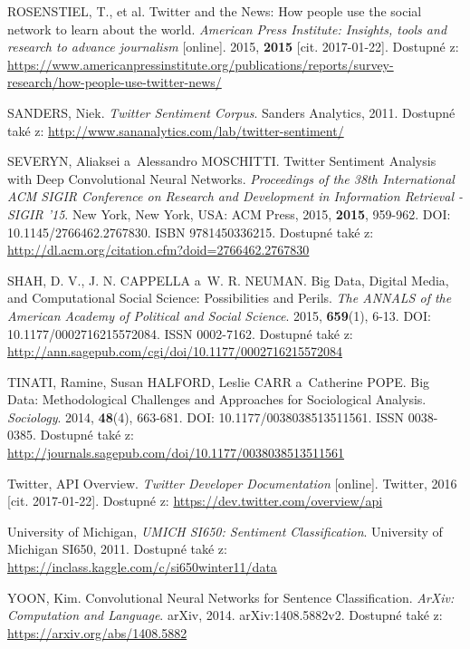 \documentclass[12pt, a4paper]{article}
\numberwithin{equation}{section} 	%
\begin{document}
\begin{thebibliography}{99}
    ROSENSTIEL, T., et al. Twitter and the News: How people use the social network to learn about the world. \textit{American Press Institute: Insights, tools and research to advance journalism} [online]. 2015, \textbf{2015} [cit. 2017-01-22]. Dostupné z: \url{https://www.americanpressinstitute.org/publications/reports/survey-research/how-people-use-twitter-news/}

    SANDERS, Niek. \textit{Twitter Sentiment Corpus}. Sanders Analytics, 2011. Dostupné také z: \url{http://www.sananalytics.com/lab/twitter-sentiment/}

    SEVERYN, Aliaksei a~Alessandro MOSCHITTI. Twitter Sentiment Analysis with Deep Convolutional Neural Networks. \textit{Proceedings of the 38th International ACM SIGIR Conference on Research and Development in Information Retrieval - SIGIR '15}. New York, New York, USA: ACM Press, 2015, \textbf{2015}, 959-962. DOI: 10.1145/2766462.2767830. ISBN 9781450336215. Dostupné také z: \url{http://dl.acm.org/citation.cfm?doid=2766462.2767830}

    SHAH, D. V., J. N. CAPPELLA a~W. R. NEUMAN. Big Data, Digital Media, and Computational Social Science: Possibilities and Perils. \textit{The ANNALS of the American Academy of Political and Social Science}. 2015, \textbf{659}(1), 6-13. DOI: 10.1177/0002716215572084. ISSN 0002-7162. Dostupné také z: \url{http://ann.sagepub.com/cgi/doi/10.1177/0002716215572084}

    TINATI, Ramine, Susan HALFORD, Leslie CARR a~Catherine POPE. Big Data: Methodological Challenges and Approaches for Sociological Analysis. \textit{Sociology}. 2014, \textbf{48}(4), 663-681. DOI: 10.1177/0038038513511561. ISSN 0038-0385. Dostupné také z: \url{http://journals.sagepub.com/doi/10.1177/0038038513511561}

    Twitter, API Overview. \textit{Twitter Developer Documentation} [online]. Twitter, 2016 [cit. 2017-01-22]. Dostupné z: \url{https://dev.twitter.com/overview/api}

    University of Michigan, \textit{UMICH SI650: Sentiment Classification}. University of Michigan SI650, 2011. Dostupné také z: \url{https://inclass.kaggle.com/c/si650winter11/data}

    YOON, Kim. Convolutional Neural Networks for Sentence Classification. \textit{ArXiv: Computation and Language}. arXiv, 2014. arXiv:1408.5882v2. Dostupné také z: \url{https://arxiv.org/abs/1408.5882}

\end{thebibliography}
\end{document}
